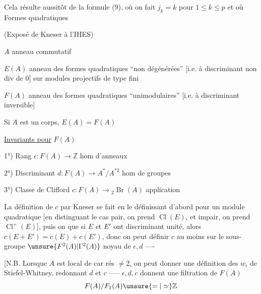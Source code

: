 Cela résulte aussitôt de la formule (9), où on fait $j_k=k$ pour $1\leq k\leq p$ et où
Formes quadratiques

(Exposé de Kneser à l’IHES)

$A$ anneau commutatif

$E(A)$ anneau des formes quadratiques ``non dégénérées'' [i.e. à discriminant non div de $0$] sur modules projectifs de type fini

$F(A)$ anneau des formes quadratiques ``unimodulaires'' [i.e. à discriminant inversible]

Si $A$ est un corps, $E(A)=F(A)$

\uline{Invariants pour} $F(A)$

1°) Rang \quad $\epsilon:F(A)\longrightarrow\mathbb Z$ \quad hom d’anneaux

2°) Discriminant \quad $d:F(A)\longrightarrow A^*/A^{*2}$ \quad hom de groupes

3°) Classe de Clifford \quad $c:F(A)\longrightarrow{}_2\operatorname{Br}(A)$ \quad application

La définition de $c$ par Kneser se fait en le définissant d’abord pour un module quadratique [en distinguant le cas pair, on prend $\operatorname{Cl}(E)$, et impair, on prend $\operatorname{Cl}^{+}(E)$], puis on  que si $E$ et $E'$ ont  discriminant unité, alors $c(E+E')=c(E)+c(E')$, donc on peut définir $c$ au moins sur le sous-groupe $\unsure{F^2(A)|\Gamma^2(A)}$ noyau de $\epsilon,d$ ----

[N.B. Lorsque $A$ est local de car rés $\neq2$, on peut donner une définition des $w_i$ de Stiefel-Whitney, redonnant $d$ et $c$ -----
$\epsilon,d,c$ donnent une filtration de $F(A)$
\[
F(A)/F_1(A)\unsure{=|\simeq}\mathbb Z
\]

